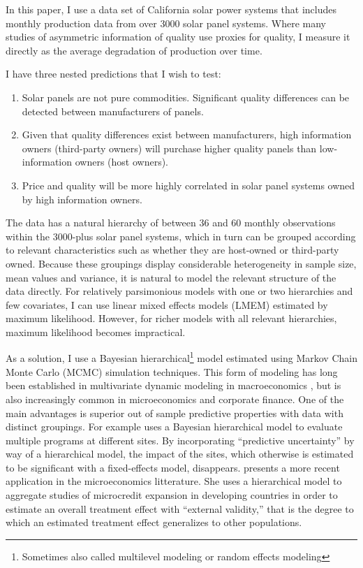 \documentclass[a4paper]{article}
\begin{document}
In this paper, I use a data set of California solar power systems that includes monthly production data from over 3000 solar panel systems. Where many studies of asymmetric information of quality use proxies for quality, I measure it directly as the average degradation of production over time.

I have three nested predictions that I wish to test:

\begin{enumerate}
  \item Solar panels are not pure commodities. Significant quality differences can be detected between manufacturers of panels.
  \item Given that quality differences exist between manufacturers, high information owners (third-party owners) will purchase higher quality panels than low-information owners (host owners).
  \item Price and quality will be more highly correlated in solar panel systems owned by high information owners.
\end{enumerate}

The data has a natural hierarchy of between 36 and 60 monthly observations within the 3000-plus solar panel systems, which in turn can be grouped according to relevant characteristics such as whether they are host-owned or third-party owned. Because these groupings display considerable heterogeneity in sample size, mean values and variance, it is natural to model the relevant structure of the data directly. For relatively parsimonious models with one or two hierarchies and few covariates, I can use linear mixed effects models (LMEM) estimated by maximum likelihood. However, for richer models with all relevant hierarchies, maximum likelihood becomes impractical.

As a solution, I use a Bayesian hierarchical\footnote{Sometimes also called multilevel modeling or random effects modeling} model estimated using Markov Chain Monte Carlo (MCMC) simulation techniques. This form of modeling has long been established in multivariate dynamic modeling in macroeconomics \citep{doan_forecasting_1984, litterman_forecasting_1986,sims_bayesian_1998, canova_forecasting_2004},  but is also increasingly common in microeconomics and corporate finance. One of the main advantages is superior out of sample predictive properties with data with distinct groupings. For example \citet{dehejia_was_2003} uses a Bayesian hierarchical model to evaluate multiple programs at different sites. By incorporating ``predictive uncertainty'' by way of a hierarchical model, the impact of the sites, which otherwise is estimated to be significant with a fixed-effects model, disappears. \citet{meager_understanding_2018} presents a more recent application in the microeconomics litterature. She uses a hierarchical model to aggregate studies of microcredit expansion in developing countries in order to estimate an overall treatment effect with ``external validity,'' that is the degree to which an estimated treatment effect generalizes to other populations.
\end{document}
